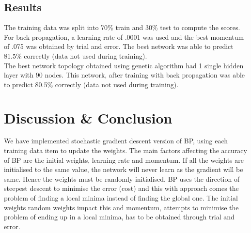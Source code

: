 \subsection{Results}
The training data was split into 70\% train and 30\% test to compute the scores. \\
For back propagation, a learning rate of .0001 was used and the best momentum of .075 was obtained by trial and error. The best network was able to predict  81.5\%  correctly (data not used during training).\\
The best network topology obtained using genetic algorithm had 1 single hidden layer with 90 nodes. This network, after training with back propagation was able to predict  80.5\%  correctly (data not used during training).
\section{Discussion \& Conclusion}
We have implemented stochastic gradient descent version of BP,  using each training data item to update the weights. The main factors affecting the accuracy of BP are the initial weights, learning rate and momentum. If all the weights are initialised to the same value, the network will never learn as the gradient will be same. Hence the weights must be randomly initialised.  BP uses the direction of steepest descent to minimise the error (cost) and this with approach comes the problem of finding a local minima instead of finding the global one. The initial weights random weights impact this and momentum, attempts to minimise the problem of ending up in a local minima, has to be obtained through trial and error.
